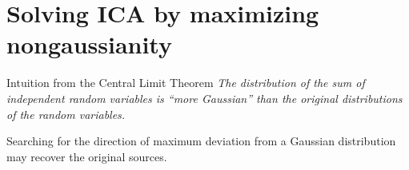 \section{Solving ICA by maximizing nongaussianity}

\begin{frame}

\begin{block}{Intuition from the Central Limit Theorem}
\emph{The distribution of the sum of independent random variables is ``more Gaussian'' than the original distributions of the random variables.}\\\vspace{2mm}

Searching for the direction of maximum deviation from a Gaussian distribution may recover the original sources.
\end{block}
\end{frame}


